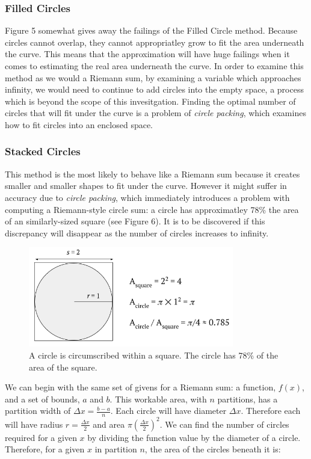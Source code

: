 \documentclass{article}
\begin{document}
      \subsubsection{Filled Circles}
        Figure 5 somewhat gives away the failings of the Filled Circle method. Because circles cannot overlap, they cannot appropriatley grow to fit the area underneath the curve. This means that the approximation will have huge failings when it comes to estimating the real area underneath the curve. In order to examine this method as we would a Riemann sum, by examining a variable which approaches infinity, we would need to continue to add circles into the empty space, a process which is beyond the scope of this invesitgation. Finding the optimal number of circles that will fit under the curve is a problem of \emph{circle packing}, which examines how to fit circles into an enclosed space.

      \subsubsection{Stacked Circles}
        This method is the most likely to behave like a Riemann sum because it creates smaller and smaller shapes to fit under the curve. However it might suffer in accuracy due to \emph{circle packing}, which immediately introduces a problem with computing a Riemann-style circle sum: a circle has approximatley 78\% the area of an similarly-sized square (see Figure 6). It is to be discovered if this discrepancy will disappear as the number of circles increases to infinity.

        \begin{figure}[h]
          \centering
          \includegraphics[width=0.8\textwidth]{circle_packing}
          \caption{A circle is circumscribed within a square. The circle has 78\% of the area of the square.}
        \end{figure}

        We can begin with the same set of givens for a Riemann sum: a function, \( f(x) \), and a set of bounds, \( a \) and \( b \). This workable area, with \( n \) partitions, has a partition width of \( \Delta x = \frac{b-a}{n} \). Each circle will have diameter \( \Delta x \). Therefore each will have radius \( r = \frac{\Delta x}{2} \) and area \( \pi \left(\frac{\Delta x}{2}\right)^2 \). We can find the number of circles required for a given \( x \) by dividing the function value by the diameter of a circle. Therefore, for a given \( x \) in partition \( n \), the area of the circles beneath it is:
\end{document}
